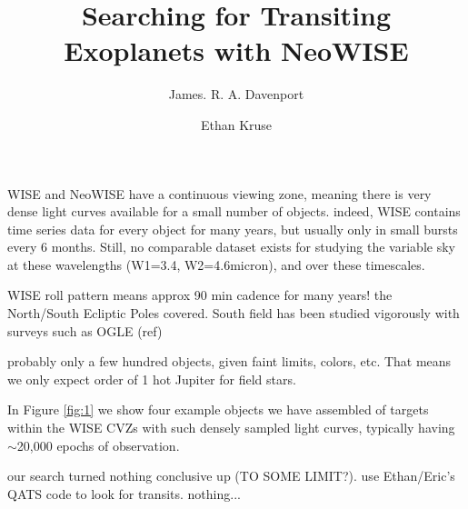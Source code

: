 \documentclass[modern]{rnaastex}
\begin{document}
\title{Searching for Transiting Exoplanets with NeoWISE}


\author{James. R. A. Davenport}


\author{Ethan Kruse}





\section{} 

WISE and NeoWISE have a continuous viewing zone, meaning there is very dense light curves available for a small number of objects. indeed, WISE contains time series data for every object for many years, but usually only in small bursts every 6 months. Still, no comparable dataset exists for studying the variable sky at these wavelengths (W1=3.4, W2=4.6micron), and over these timescales.

WISE roll pattern means approx 90 min cadence for many years! the North/South Ecliptic Poles covered. South field has been studied vigorously with surveys such as OGLE (ref)

probably only a few hundred objects, given faint limits, colors, etc. That means we only expect order of 1 hot Jupiter for field stars.

In Figure \ref{fig:1} we show four example objects we have assembled of targets within the WISE CVZs with such densely sampled light curves, typically having $\sim$20,000 epochs of observation.

our search turned nothing conclusive up (TO SOME LIMIT?).  use Ethan/Eric's QATS code to look for transits. nothing... 
\end{document}
